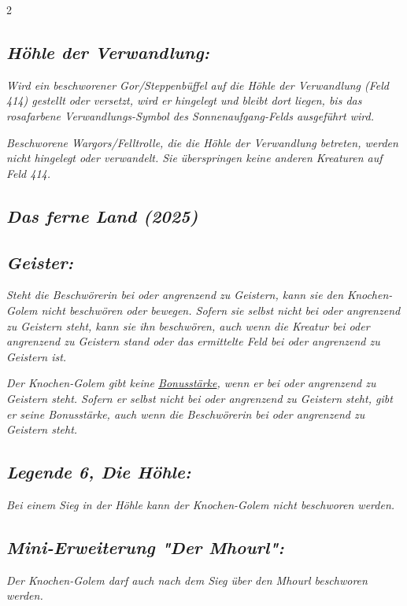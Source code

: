 \documentclass[10pt, a4paper, oneside]{book}
\newcommand{\fan}[1]{\textit{#1}}
\begin{document}
\begin{multicols*}{2}
\begin{bgcolor}
\subsection{\fan{Höhle der Verwandlung:}}

\fan{Wird ein beschworener Gor/Steppenbüffel auf die Höhle der Verwandlung (Feld 414) gestellt oder versetzt, wird er hingelegt und bleibt dort liegen, bis das rosafarbene Verwandlungs-Symbol des Sonnenaufgang-Felds ausgeführt wird.}

\fan{Beschworene Wargors/Felltrolle, die die Höhle der Verwandlung betreten, werden nicht hingelegt oder verwandelt. Sie überspringen keine anderen Kreaturen auf Feld 414.}

\end{bgcolor}






\begin{bgcolor}
\section{\fan{Das ferne Land (2025)}}

\subsection{\fan{Geister:}}

\fan{Steht die Beschwörerin bei oder angrenzend zu Geistern, kann sie den Knochen-Golem nicht beschwören oder bewegen. Sofern sie selbst nicht bei oder angrenzend zu Geistern steht, kann sie ihn beschwören, auch wenn die Kreatur bei oder angrenzend zu Geistern stand oder das ermittelte Feld bei oder angrenzend zu Geistern ist.}

\fan{Der Knochen-Golem gibt keine \hyperref[Bonusstärke]{Bonusstärke}, wenn er bei oder angrenzend zu Geistern steht. Sofern er selbst nicht bei oder angrenzend zu Geistern steht, gibt er seine Bonusstärke, auch wenn die Beschwörerin bei oder angrenzend zu Geistern steht.}


\subsection{\fan{Legende 6, Die Höhle:}}

\fan{Bei einem Sieg in der Höhle kann der Knochen-Golem nicht beschworen werden.}


\subsection{\fan{Mini-Erweiterung "Der Mhourl":}}

\fan{Der Knochen-Golem darf auch nach dem Sieg über den Mhourl beschworen werden.}



\end{bgcolor}




\end{multicols*}
\end{document}
